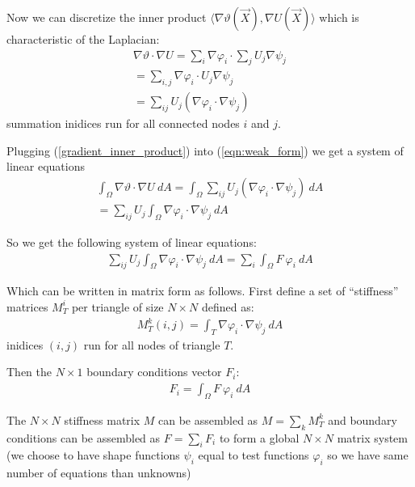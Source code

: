\documentclass{birkjour}
\numberwithin{equation}{section}
\begin{document}
Now we can discretize the inner product $\langle \nabla \vartheta(\vec X), \nabla U(\vec X)\rangle$ which is characteristic of the Laplacian:
\begin{eqnarray}
	\label{gradient_inner_product}
	\nabla \vartheta \cdot \nabla U = \sum_i { \nabla \varphi_i } \cdot \sum_j { U_j \nabla \psi_j } \nonumber\\
	= \sum_{i,j} { \nabla \varphi_i \cdot U_j \nabla \psi_j } \nonumber\\
	= \sum_{ij} {U_j \left( \nabla \varphi_i \cdot \nabla \psi_j \right)}
\end{eqnarray}
summation inidices run for all connected nodes $i$ and $j$.

Plugging (\ref{gradient_inner_product}) into (\ref{eqn:weak_form}) we get a system of linear equations
\begin{eqnarray}
	\int_{\Omega}{  \nabla \vartheta \cdot \nabla U \ dA}  = \int_{\Omega}{ \sum_{ij} {U_j \left( \nabla \varphi_i \cdot \nabla \psi_j \right) } \ dA}  \nonumber\\
	= \sum_{ij} {U_j \int_{\Omega}{ \nabla \varphi_i \cdot \nabla \psi_j \ dA }}  \nonumber
\end{eqnarray}

So we get the following system of linear equations:
\begin{eqnarray} 
	\sum_{ij} {U_j \int_{\Omega}{ \nabla \varphi_i \cdot \nabla \psi_j \ dA}} = \sum_i { \int_{\Omega}{ F \ \varphi_i \ dA }}
\end{eqnarray}

Which can be written in matrix form as follows. First define a set of ``stiffness'' matrices $M_T^i$ per triangle 
of size $N \times N$ defined as:
\begin{eqnarray} 
	M_T^k(i,j) = \int_{T}{ \nabla \varphi_i \cdot \nabla \psi_j \ dA} \nonumber
\end{eqnarray}
inidices $(i,j)$ run for all nodes of triangle $T$.

Then the $N \times 1$ boundary conditions vector $F_i$:
\begin{eqnarray} 
	F_i  = \int_{\Omega}{ F \ \varphi_i \ dA } \nonumber
\end{eqnarray}

The $N \times N$ stiffness matrix $M$ can be assembled as $M = \sum_k M_T^k$ and boundary conditions can be assembled as $F = \sum_i F_i$ to 
form a global $N \times N$ matrix system (we choose to have shape functions $\psi_i$ equal to test functions $\varphi_i$ so 
we have same number of equations than unknowns)
\end{document}
